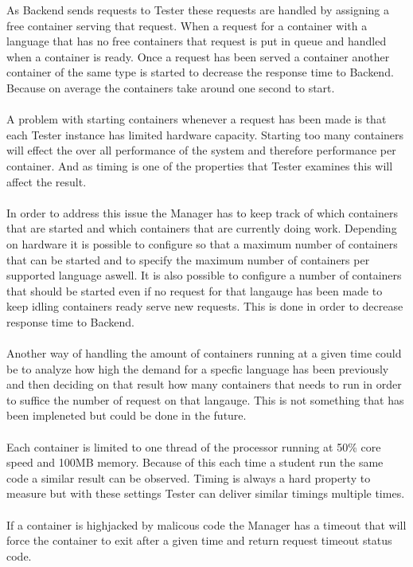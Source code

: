As Backend sends requests to Tester these requests are handled by assigning a free container serving that request.
When a request for a container with a language that has no free containers that
request is put in queue and handled when a container is ready. Once a request has
been served a container another container of the same type is started to decrease
the response time to Backend. Because on average the containers
take around one second to start.\\
\\
A problem with starting containers whenever a request has been made
is that each Tester instance has limited hardware capacity. Starting too many
containers will effect the over all performance of the system and therefore
performance per container. And as timing is one of the properties that Tester
examines this will affect the result.\\
\\
In order to address this issue the Manager has to keep track of which containers
that are started and which containers that are currently doing work. Depending on
hardware it is possible to configure so that a maximum number of containers that
can be started and to specify the maximum number of containers
per supported language aswell. It is also possible to configure a number of containers
that should be started even if no request for that langauge has been made to keep
idling containers ready serve new requests. This is done in order to decrease
response time to Backend.\\
\\
Another way of handling the amount of containers running at a given time could
be to analyze how high the demand for a specfic language has been previously and
then deciding on that result how many containers that needs to run in order to
suffice the number of request on that langauge. This is not something that has
been impleneted but could be done in the future.\\
\\
Each container is limited to one thread of the processor running at 50\% core speed and
100MB memory. Because of this each time a student run the same code a similar
result can be observed. Timing is always a hard property to measure but with
these settings Tester can deliver similar timings multiple times.\\
\\
If a container is highjacked by malicous code the Manager has a timeout that will
force the container to exit after a given time and return request timeout status code.

